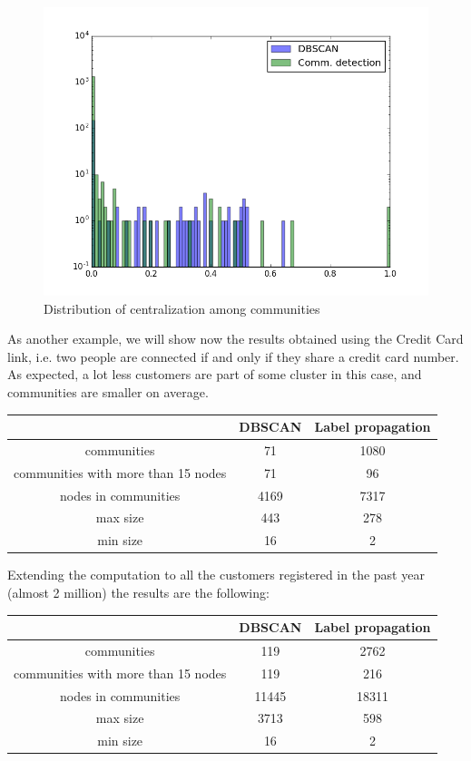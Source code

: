 \documentclass[a4paper,11pt]{book}
\begin{document}
  \begin{figure}[H]
\centering
\includegraphics[height=7.25 cm,width=10 cm]{plot_net_centralization_broker.png}
\caption{Distribution of centralization among communities}

\end{figure}
As another example, we will show now the results obtained using the Credit Card link, i.e. two people are connected if and only if they share a credit card number. As expected, a lot less customers are part of some cluster in this case, and communities are smaller on average.
 \begin{center}
  \begin{tabular}{||c|c|c||}
\hline
 \phantom{0} & DBSCAN & Label propagation \\ 
\hline
communities & 71 & 1080 \\
\hline
communities with more than 15 nodes & 71 & 96 \\
\hline
nodes in communities & 4169 & 7317 \\
\hline
max size & 443 & 278 \\
\hline
min size & 16 & 2 \\
\hline
\end{tabular}
\end{center}
Extending the computation to all the customers registered in the past year (almost 2 million) the results are the following:
 \begin{center}
  \begin{tabular}{||c|c|c||}
\hline
 \phantom{0} & DBSCAN & Label propagation \\ 
\hline
communities & 119 & 2762 \\
\hline
communities with more than 15 nodes & 119 & 216 \\
\hline
nodes in communities & 11445 & 18311 \\
\hline
max size & 3713 & 598 \\
\hline
min size & 16 & 2 \\
\hline
\end{tabular}
\end{center}
\end{document}
